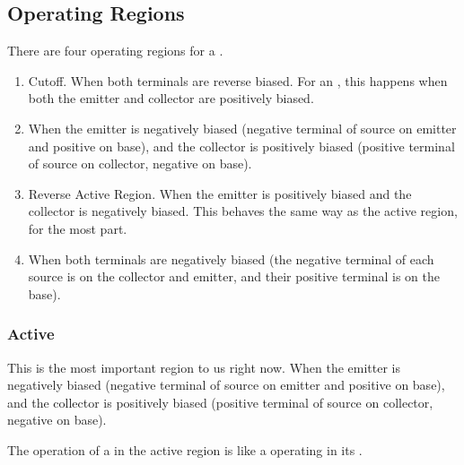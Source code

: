\subsection{Operating Regions}\label{subsec:Operating_Regions}
There are four operating regions for a .
\begin{enumerate}[noitemsep]
\item Cutoff.
  When both terminals are reverse biased.
  For an \NPNTransistor{}, this happens when both the emitter and collector are positively biased.
\item {}
  When the emitter is negatively biased (negative terminal of source on emitter and positive on base), and the collector is positively biased (positive terminal of source on collector, negative on base).
\item Reverse Active Region.
  When the emitter is positively biased and the collector is negatively biased.
  This behaves the same way as the active region, for the most part.
\item {}
  When both terminals are negatively biased (the negative terminal of each source is on the collector and emitter, and their positive terminal is on the base).
\end{enumerate}

\subsubsection{Active}\label{subsubsec:BJT_Active_Region}
This is the most important region to us right now.
When the emitter is negatively biased (negative terminal of source on emitter and positive on base), and the collector is positively biased (positive terminal of source on collector, negative on base).

\begin{remark*}
  The operation of a  in the active region is like a  operating in its .
\end{remark*}


